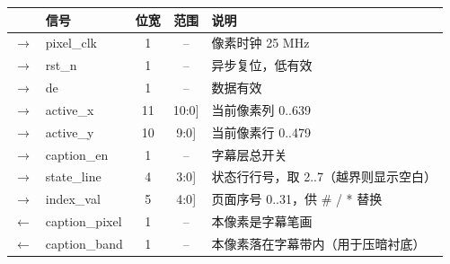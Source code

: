 \begin{tabular}{@{}c l c c p{7.2cm}@{}}
\toprule
\textbf{} & \textbf{信号} & \textbf{位宽} & \textbf{范围} & \textbf{说明}\\
\midrule
$\rightarrow$ & {\ttfamily pixel\_clk} & 1 & {\scriptsize\ttfamily --} & 像素时钟 25 MHz \\
$\rightarrow$ & {\ttfamily rst\_n} & 1 & {\scriptsize\ttfamily --} & 异步复位，低有效 \\
$\rightarrow$ & {\ttfamily de} & 1 & {\scriptsize\ttfamily --} & 数据有效 \\
$\rightarrow$ & {\ttfamily active\_x} & 11 & {\scriptsize\ttfamily {[}10:0{]}} & 当前像素列 0..639 \\
$\rightarrow$ & {\ttfamily active\_y} & 10 & {\scriptsize\ttfamily {[}9:0{]}} & 当前像素行 0..479 \\
$\rightarrow$ & {\ttfamily caption\_en} & 1 & {\scriptsize\ttfamily --} & 字幕层总开关 \\
$\rightarrow$ & {\ttfamily state\_line} & 4 & {\scriptsize\ttfamily {[}3:0{]}} & 状态行行号，取 2..7（越界则显示空白） \\
$\rightarrow$ & {\ttfamily index\_val} & 5 & {\scriptsize\ttfamily {[}4:0{]}} & 页面序号 0..31，供 \# / * 替换 \\
$\leftarrow$ & {\ttfamily caption\_pixel} & 1 & {\scriptsize\ttfamily --} & 本像素是字幕笔画 \\
$\leftarrow$ & {\ttfamily caption\_band} & 1 & {\scriptsize\ttfamily --} & 本像素落在字幕带内（用于压暗衬底） \\
\bottomrule
\end{tabular}
